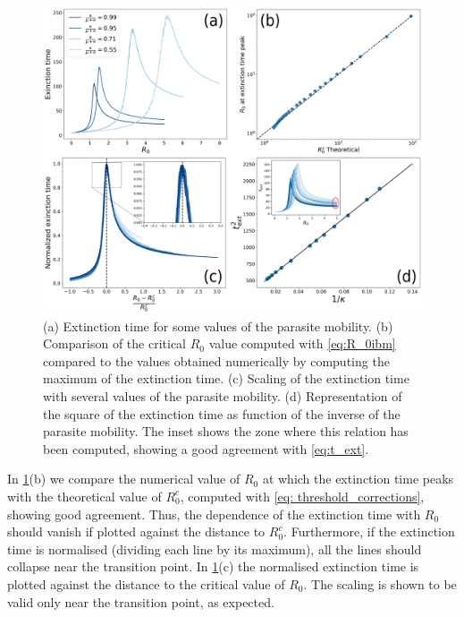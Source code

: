 \begin{figure}[H]
    \centering
    \includegraphics[width=\textwidth]{Figures/Extinction_time.png}
    \caption{(a) Extinction time for some values of the parasite mobility.
        (b) Comparison of the critical $R_0$ value computed with
        \cref{eq:R_0ibm}
        compared to the values obtained numerically by computing the maximum of
        the
        extinction time. (c) Scaling of the extinction time with several values
        of the
        parasite mobility. (d) Representation of the square of the extinction
        time as
        function of the inverse of the parasite mobility. The inset shows the
        zone
        where this relation has been computed, showing a good agreement with
        \cref{eq:t_ext}.}
    \label{fig:extinction_time}
\end{figure}

In \cref{fig:extinction_time}(b) we compare the numerical value of $R_0$ at
which the extinction time peaks with the theoretical value of $R_0^c$, computed
with \cref{eq: threshold_corrections}, showing good agreement. Thus, the
dependence of the extinction time with $R_0$ should vanish if plotted against
the distance to $R_0^c$. Furthermore, if the extinction time is normalised
(dividing each line by its maximum), all the lines should collapse near the
transition point. In \cref{fig:extinction_time}(c) the normalised extinction
time is plotted against the distance to the critical value of $R_0$. The
scaling is shown to be valid only near the transition point, as expected.

